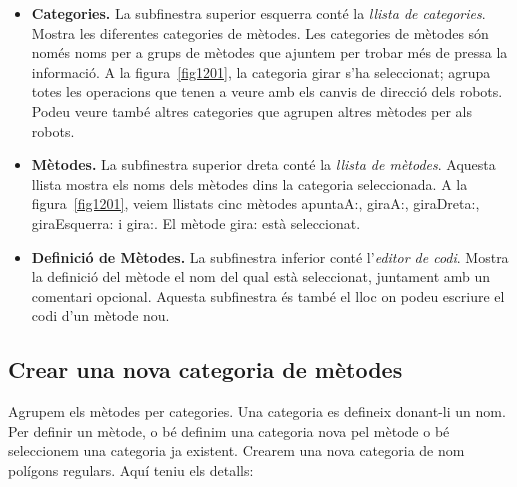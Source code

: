 \begin{itemize}
\item[] \textbf{Categories.} La subfinestra superior esquerra conté la \emph{llista de categories}. Mostra les diferentes categories de mètodes. Les categories de mètodes són només noms per a grups de mètodes que ajuntem per trobar més de pressa la informació. A la figura~\ref{fig1201}, la categoria \textsf{girar} s'ha seleccionat; agrupa totes les operacions que tenen a veure amb els canvis de direcció dels robots. Podeu veure també altres categories que agrupen altres mètodes per als robots. 
\item[] \textbf{Mètodes.} La subfinestra superior dreta conté la \emph{llista de mètodes}. Aquesta llista mostra els noms dels mètodes dins la categoria seleccionada. A la figura~\ref{fig1201}, veiem llistats cinc mètodes \textsf{apuntaA:}, \textsf{giraA:}, \textsf{giraDreta:}, \textsf{giraEsquerra:} i \textsf{gira:}. El mètode \textsf{gira:} està seleccionat.
\item[] \textbf{Definició de Mètodes.} La subfinestra inferior conté l'\emph{editor de codi}. Mostra la definició del mètode el nom del qual està seleccionat, juntament amb un comentari opcional. Aquesta subfinestra és també el lloc on podeu escriure el codi d'un mètode nou.
\end{itemize}

\subsection{Crear una nova categoria de mètodes}
Agrupem els mètodes per categories. Una categoria es defineix donant-li un nom. Per definir un mètode, o bé definim una categoria nova pel mètode o bé seleccionem una categoria ja existent. Crearem una nova categoria de nom \textsf{polígons regulars}. Aquí teniu els detalls:

